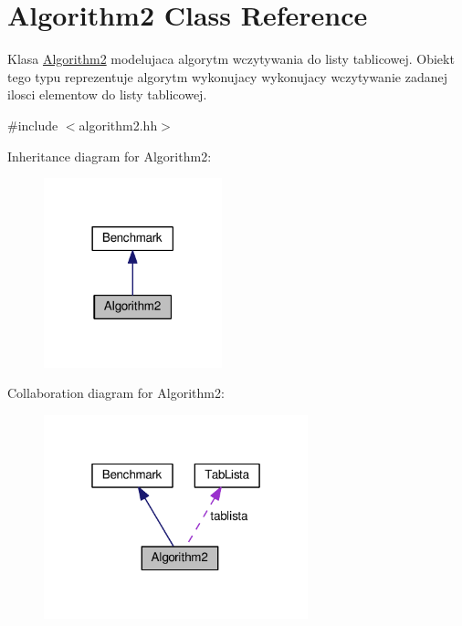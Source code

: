 \hypertarget{class_algorithm2}{}\section{Algorithm2 Class Reference}
\label{class_algorithm2}


Klasa \hyperlink{class_algorithm2}{Algorithm2} modelujaca algorytm wczytywania do listy tablicowej. Obiekt tego typu reprezentuje algorytm wykonujacy wykonujacy wczytywanie zadanej ilosci elementow do listy tablicowej.  




{\ttfamily \#include $<$algorithm2.\+hh$>$}



Inheritance diagram for Algorithm2\+:\nopagebreak
\begin{figure}[H]
\begin{center}
\leavevmode
\includegraphics[width=146pt]{class_algorithm2__inherit__graph}
\end{center}
\end{figure}


Collaboration diagram for Algorithm2\+:\nopagebreak
\begin{figure}[H]
\begin{center}
\leavevmode
\includegraphics[width=217pt]{class_algorithm2__coll__graph}
\end{center}
\end{figure}
